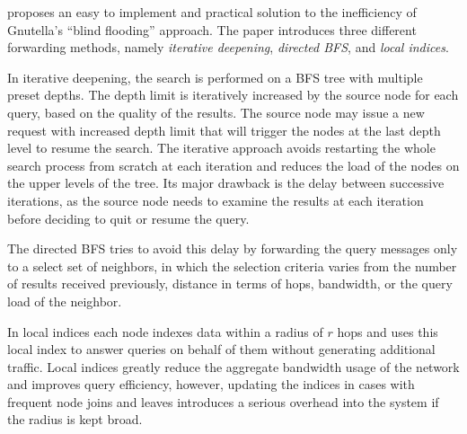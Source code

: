 
\cite{YG-M2002} proposes an easy to implement and practical solution to the
inefficiency of Gnutella's ``blind flooding'' approach. The paper introduces
three different forwarding methods, namely \emph{iterative deepening},
\emph{directed BFS}, and \emph{local indices}.

In iterative deepening, %
the search is
performed on a BFS tree with multiple preset depths. The depth limit is
iteratively increased by the source node for each query, based on the quality of
the results. The source node may issue a new request with increased depth limit
that will trigger the nodes at the last depth level to resume the search. The
iterative approach avoids restarting the whole search process from scratch at
each iteration and reduces the load of the nodes on the upper levels of the
tree. Its major drawback is the delay between successive iterations, as the
source node needs to examine the results at each iteration before deciding to
quit or resume the query.

The directed BFS
tries to avoid this delay by forwarding the query messages only to a select
set of neighbors, in which the selection criteria varies from the number of
results received previously, distance in terms of hops, bandwidth, or the query
load of the neighbor.

In local indices
each node
indexes data within a radius of $r$ hops and uses this local index to answer
queries on behalf of them without generating additional traffic. Local indices
greatly reduce the aggregate bandwidth usage of the network and improves query
efficiency, however, updating the indices in cases with frequent node joins and
leaves introduces a serious overhead into the system if the radius is kept broad.

